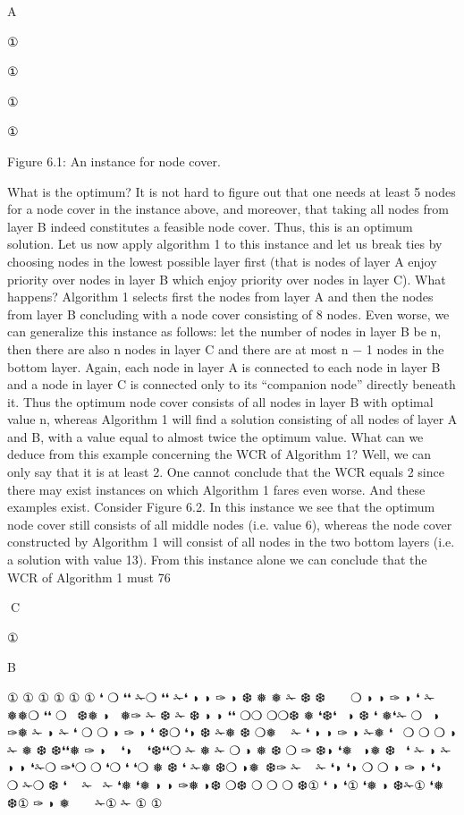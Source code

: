 \documentclass[titlepage]{book}
\theoremstyle{plain}
\theoremstyle{definition}
\theoremstyle{remark}
\begin{document}
A

①

①

①

①

Figure 6.1: An instance for node cover.

What is the optimum? It is not hard to figure out that one needs at least 5 nodes for a node cover in
the instance above, and moreover, that taking all nodes from layer B indeed constitutes a feasible node
cover. Thus, this is an optimum solution. Let us now apply algorithm 1 to this instance and let us break
ties by choosing nodes in the lowest possible layer first (that is nodes of layer A enjoy priority over nodes
in layer B which enjoy priority over nodes in layer C). What happens? Algorithm 1 selects first the nodes
from layer A and then the nodes from layer B concluding with a node cover consisting of 8 nodes. Even
worse, we can generalize this instance as follows: let the number of nodes in layer B be n, then there
are also n nodes in layer C and there are at most n − 1 nodes in the bottom layer. Again, each node in
layer A is connected to each node in layer B and a node in layer C is connected only to its “companion
node” directly beneath it. Thus the optimum node cover consists of all nodes in layer B with optimal
value n, whereas Algorithm 1 will find a solution consisting of all nodes of layer A and B, with a value
equal to almost twice the optimum value. What can we deduce from this example concerning the WCR
of Algorithm 1? Well, we can only say that it is at least 2. One cannot conclude that the WCR equals 2
since there may exist instances on which Algorithm 1 fares even worse.
And these examples exist. Consider Figure 6.2.
In this instance we see that the optimum node cover still consists of all middle nodes (i.e. value 6),
whereas the node cover constructed by Algorithm 1 will consist of all nodes in the two bottom layers (i.e.
a solution with value 13). From this instance alone we can conclude that the WCR of Algorithm 1 must
76

C

①

B

①
①
①
①
①
①
❛
❍
❛❛ ✁❍
❛❛ ✁❛
◗
◗
✑
◗
❆
❅
❅
✁
❆
❆
 
 
❍
◗
◗
✑
◗ ❛ ✁ ❅❅❍
❛❛
❍  ❆❅ ◗  ❅✑ ✁ ❆
✁ ❆ ◗
◗ ❛❛ ❍❍
❍❍❆ ❅
❛❆❛  ◗
❆
❛
❅❛✁ ❍
 ◗ ✑❅ ✁
◗
✁
❛
❍
❍
◗
✑
◗
❛ ❆❍ ❛◗
❆
✁❅
❆ ❍❅
 
✁
❛
◗
◗
✑
◗ ✁❅ ❛ 
❍
❍
❍ ◗
✁ ❅ ❆
❆❛❛❅
✑
◗
  ❛◗
  ❛❆❛❛❍
✁ ❅
✁
❍ ◗ ❅ ❆
❍
✑ ❆◗ ❛❅
 ◗❅ ❆  ❛
✁ ◗
✁
◗
◗ ❛✁❍
✑❛❍
❍
❛❍
❛
❛❍
❅ ❆
❛
✁❅
❆❍
◗❅ ❆✑
✁  
✁
❛◗
❛◗
❍
❍
◗
✑
◗
❛◗
❍
✁❍
❆ ❛
 
✁ 
✁
❛❅
❛❅
◗
◗
✑❅
◗❆
❍❆
❍
❍
❍
❆①
❛
◗
❛① ❛❅
◗
❆✁① ❛❅
❆①
✑
◗
❅
 
 
✁①
✁
①
①
\end{document}
